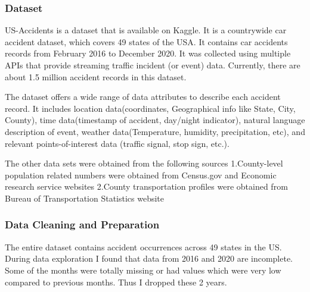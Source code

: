 \documentclass[
]{article}
\newenvironment{Shaded}{\begin{snugshade}}{\end{snugshade}}
\newcommand{\FunctionTok}[1]{\textcolor[rgb]{0.00,0.00,0.00}{#1}}
\newcommand{\NormalTok}[1]{#1}
\newcommand{\OtherTok}[1]{\textcolor[rgb]{0.56,0.35,0.01}{#1}}
\newcommand{\SpecialCharTok}[1]{\textcolor[rgb]{0.00,0.00,0.00}{#1}}
\newcommand{\StringTok}[1]{\textcolor[rgb]{0.31,0.60,0.02}{#1}}
\begin{document}
\hypertarget{dataset}{%
\subsubsection{Dataset}\label{dataset}}

US-Accidents is a dataset that is available on Kaggle. It is a
countrywide car accident dataset, which covers 49 states of the USA. It
contains car accidents records from February 2016 to December 2020. It
was collected using multiple APIs that provide streaming traffic
incident (or event) data. Currently, there are about 1.5 million
accident records in this dataset.

The dataset offers a wide range of data attributes to describe each
accident record. It includes location data(coordinates, Geographical
info like State, City, County), time data(timestamp of accident,
day/night indicator), natural language description of event, weather
data(Temperature, humidity, precipitation, etc), and relevant
points-of-interest data (traffic signal, stop sign, etc.).

The other data sets were obtained from the following sources
1.County-level population related numbers were obtained from Census.gov
and Economic research service websites 2.County transportation profiles
were obtained from Bureau of Transportation Statistics website

\begin{Shaded}
\end{Shaded}

\hypertarget{data-cleaning-and-preparation}{%
\subsubsection{Data Cleaning and
Preparation}\label{data-cleaning-and-preparation}}

The entire dataset contains accident occurrences across 49 states in the
US. During data exploration I found that data from 2016 and 2020 are
incomplete. Some of the months were totally missing or had values which
were very low compared to previous months. Thus I dropped these 2 years.
\end{document}
